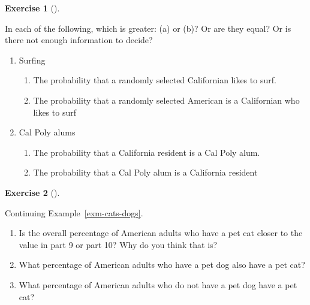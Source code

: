 \documentclass[
  letterpaper,
  DIV=11,
  numbers=noendperiod]{scrreprt}
\providecommand{\tightlist}{%
  \setlength{\itemsep}{0pt}\setlength{\parskip}{0pt}}
\theoremstyle{plain}
\theoremstyle{definition}
\theoremstyle{definition}
\newtheorem{exercise}{Exercise}[chapter]
\theoremstyle{definition}
\theoremstyle{remark}
\begin{document}
\begin{exercise}[]\protect\hypertarget{exr-greater-prob-of-what}{}\label{exr-greater-prob-of-what}

In each of the following, which is greater: (a) or (b)? Or are they
equal? Or is there not enough information to decide?

\begin{enumerate}
\def\labelenumi{\arabic{enumi}.}
\tightlist
\item
  Surfing

  \begin{enumerate}
  \def\labelenumii{\alph{enumii}.}
  \tightlist
  \item
    The probability that a randomly selected Californian likes to surf.
  \item
    The probability that a randomly selected American is a Californian
    who likes to surf
  \end{enumerate}
\item
  Cal Poly alums

  \begin{enumerate}
  \def\labelenumii{\alph{enumii}.}
  \tightlist
  \item
    The probability that a California resident is a Cal Poly alum.
  \item
    The probability that a Cal Poly alum is a California resident
  \end{enumerate}
\end{enumerate}

\end{exercise}

\begin{exercise}[]\protect\hypertarget{exr-more-cats-dogs}{}\label{exr-more-cats-dogs}

Continuing Example~\ref{exm-cats-dogs}.

\begin{enumerate}
\def\labelenumi{\arabic{enumi}.}
\tightlist
\item
  Is the overall percentage of American adults who have a pet cat closer
  to the value in part 9 or part 10? Why do you think that is?
\item
  What percentage of American adults who have a pet dog also have a pet
  cat?
\item
  What percentage of American adults who do not have a pet dog have a
  pet cat?
\end{enumerate}

\end{exercise}
\end{document}

